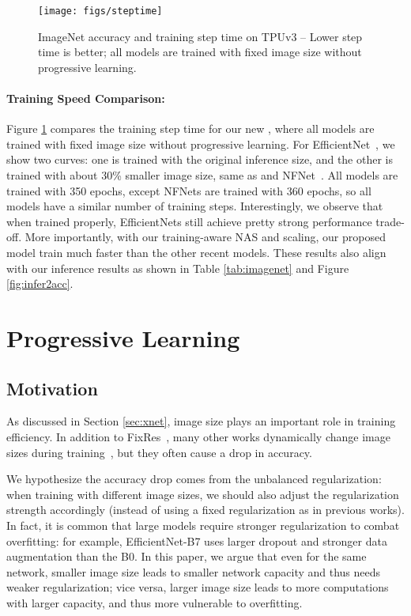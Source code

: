 \documentclass{article}
\begin{document}
\begin{figure}[!ht]
    \centering
    \texttt{[image: figs/steptime]}
    \vskip -0.15in
    \caption{ImageNet accuracy and training step time on TPUv3 -- Lower step time is better; all models are trained with fixed image size without progressive learning.}
     \label{fig:steptime}
    \vskip -0.1in
\end{figure}
 
\paragraph{Training Speed Comparison:}
Figure \ref{fig:steptime} compares the training step time for our new {\xnet}, where all models are trained with fixed image size without progressive learning. For EfficientNet~\cite{efficientnet19}, we show two curves: one is trained with the original inference size, and the other is trained with about 30\% smaller image size, same as {\xnet} and NFNet~\cite{fixres20,nfnet21}. All models are trained with 350 epochs, except  NFNets are trained with 360 epochs, so all models have a similar number of training steps. Interestingly, we observe that when trained properly, EfficientNets still achieve pretty strong performance trade-off. More importantly, with our training-aware NAS and scaling, our  proposed {\xnet} model train much faster than the other recent models. These results  also align with our inference results as shown in Table \ref{tab:imagenet} and Figure \ref{fig:infer2acc}.



\section{Progressive Learning}
\label{sec:plearn}


\subsection{Motivation}
\label{sec:motivation}

As discussed in Section \ref{sec:xnet}, image size plays an important role in training efficiency. In addition to FixRes~\cite{fixres20}, many other works dynamically change image sizes during training~\cite{fastaidawnbench,mixmatch19}, but they often cause a drop in accuracy.

We hypothesize the accuracy drop comes from the unbalanced regularization: when training with different image sizes, we should also adjust the regularization strength accordingly (instead of using a fixed regularization as in previous works). In fact, it is common that large models require stronger regularization to combat overfitting: for example, EfficientNet-B7 uses larger dropout and stronger data augmentation than the B0. In this paper, we argue that even for the same network, smaller image size leads to smaller network capacity and thus needs weaker regularization; vice versa, larger image size leads to more computations with larger capacity,  and thus more vulnerable to
overfitting.
\end{document}
